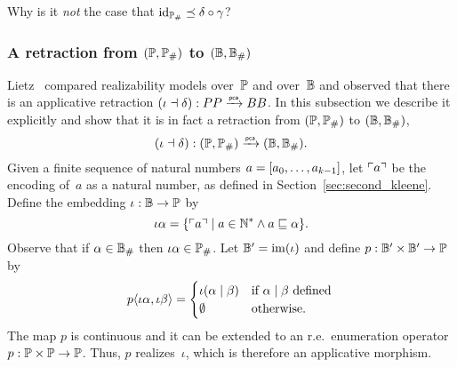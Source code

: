 \begin{exercise}
  Why is it \emph{not} the case that $\id[\comp{\Scott}] \preceq \delta \circ \gamma$?
\end{exercise}





\subsubsection{A retraction from $(\Scott, \comp{\Scott})$ to
  $(\Baire, \comp{\Baire})$}
\label{sec:retraction-PP-BB}%

%

Lietz~\cite{Lietz:99} compared realizability models over~$\Scott$ and
over~$\Baire$ and observed that there is an applicative retraction
$(\iota \dashv \delta): PP \pcato BB$. In this subsection we
describe it explicitly and show that it is in fact a retraction from
$(\Scott, \comp{\Scott})$ to $(\Baire, \comp{\Baire})$,
\begin{equation*}
  (\iota \dashv \delta): (\Scott, \comp{\Scott}) \pcato (\Baire, \comp{\Baire}).
\end{equation*}
Given a finite sequence of natural numbers $a = \seq{a_0, \ldots,
  a_{k-1}}$, let $\code{a}$ be the encoding of~$a$ as a natural
number, as defined in Section~\ref{sec:second_kleene}. Define the
embedding $\iota: \Baire \to \Scott$ by
\begin{equation*}
  \iota \alpha =
  \set{ \code{a} \such
    a \in \NN^{*} \land a  \sqsubseteq \alpha 
    }.
\end{equation*}
Observe that if $\alpha \in \comp{\Baire}$ then $\iota \alpha \in \comp{\Scott}$.
Let $\Baire' = \im{\iota}$ and define $p: \Baire' \times \Baire' \to \Scott$
by
\begin{equation*}
  p \pair{\iota \alpha, \iota \beta} =
  \begin{cases}
    \iota (\alpha \mid \beta) 
    & \text{if $\alpha \mid \beta$ defined} \,\\
    \emptyset
    & \text{otherwise}.
  \end{cases}
\end{equation*}
The map $p$ is continuous and it can be extended to an
r.e.~enumeration operator $p: \Scott \times \Scott \to \Scott$. Thus, $p$
realizes~$\iota$, which is therefore an applicative morphism.

